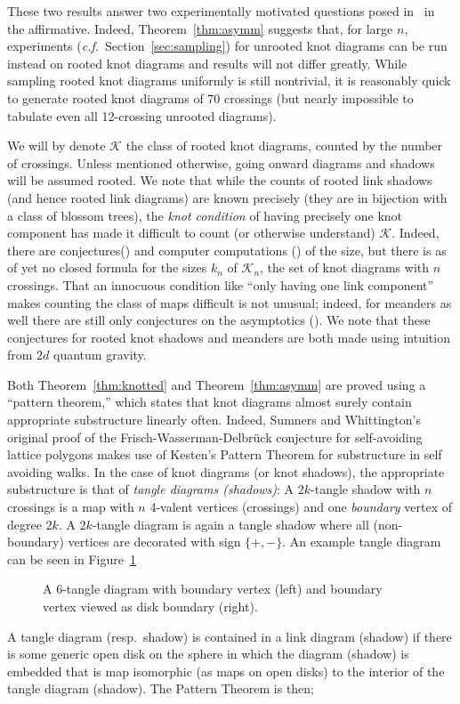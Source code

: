 \documentclass[submission%
]{dmtcs}
\newcommand{\KnotDiaClass}{\mathscr{K}}
\newcommand{\KnotDiaCard}{k}
\begin{document}
These two results answer two experimentally motivated questions posed
in~\cite{CCMknotdiagrams2015} in the affirmative. Indeed,
Theorem~\ref{thm:asymm} suggests that, for large $n$, experiments
(\textit{c.f.}\ Section~\ref{sec:sampling}) for unrooted knot diagrams
can be run instead on rooted knot diagrams and results will not differ
greatly. While sampling rooted knot diagrams uniformly is still
nontrivial, it is reasonably quick to generate rooted knot diagrams of
70 crossings (but nearly impossible to tabulate even all 12-crossing
unrooted diagrams).

We will by denote $\KnotDiaClass$ the class of rooted knot diagrams,
counted by the number of crossings. Unless mentioned otherwise, going
onward diagrams and shadows will be assumed rooted. We note that while
the counts of rooted link shadows (and hence rooted link diagrams) are
known precisely (they are in bijection with a class of blossom trees),
the \emph{knot condition} of having precisely one knot component has
made it difficult to count (or otherwise understand)
$\KnotDiaClass$. Indeed, there are
conjectures(\cite{pzjschaeff2004planecurveasymp}) and computer
computations
(\cite{zuber2015mapsimsperms,pzjtransfermtx,pzjmtxintchap}) of the
size, but there is as of yet no closed formula for the sizes
$\KnotDiaCard_n$ of $\KnotDiaClass_n$, the set of knot diagrams with
$n$ crossings. That an innocuous condition like ``only having one link
component'' makes counting the class of maps difficult is not unusual;
indeed, for meanders as well there are still only conjectures on the
asymptotics (\cite{DiFrancesco2000699}). We note that these conjectures
for rooted knot shadows and meanders are both made using intuition
from $2d$ quantum gravity.

Both Theorem~\ref{thm:knotted} and Theorem~\ref{thm:asymm} are proved
using a ``pattern theorem,'' which states that knot diagrams almost
surely contain appropriate substructure linearly often. Indeed,
Sumners and Whittington's original proof of the
Frisch-Wasserman-Delbr\"uck conjecture for self-avoiding lattice
polygons makes use of Kesten's Pattern Theorem for substructure in
self avoiding walks. In the case of knot diagrams (or knot shadows),
the appropriate substructure is that of \emph{tangle diagrams
  (shadows)}: A $2k$-tangle shadow with $n$ crossings is a map with
$n$ 4-valent vertices (crossings) and one \emph{boundary} vertex of
degree $2k$. A $2k$-tangle diagram is again a tangle shadow where all
(non-boundary) vertices are decorated with sign $\{+,-\}$. An example
tangle diagram can be seen in Figure~\ref{fig:tangleex}
\begin{figure}[hbtp]
  \centering
  \subfigure{}\hfil
  \subfigure{}
  \caption{A 6-tangle diagram with boundary vertex (left) and boundary
    vertex viewed as disk boundary (right).}
  \label{fig:tangleex}
\end{figure}
A tangle
diagram (resp.\ shadow) is contained in a link diagram (shadow) if
there is some generic open disk on the sphere in which the diagram
(shadow) is embedded that is map isomorphic (as maps on open disks) to
the interior of the tangle diagram (shadow). The Pattern Theorem is
then;
\end{document}
